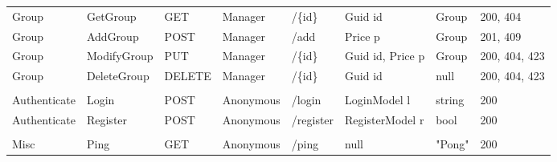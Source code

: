 \begin{table}
\begin{tabular}{llllllll}
	Group        & GetGroup      & GET     & Manager   & /\{id\}   & Guid id            & Group                             & 200, 404      \\
	Group        & AddGroup      & POST    & Manager   & /add      & Price p            & Group                             & 201, 409      \\
	Group        & ModifyGroup   & PUT     & Manager   & /\{id\}   & Guid id, Price p   & Group                             & 200, 404, 423 \\
	Group        & DeleteGroup   & DELETE  & Manager   & /\{id\}   & Guid id            & null                              & 200, 404, 423 \\
	&               &         &           &           &                    &                                   &               \\
	Authenticate & Login         & POST    & Anonymous & /login    & LoginModel l       & string                            & 200           \\
	Authenticate & Register      & POST    & Anonymous & /register & RegisterModel r    & bool                              & 200           \\
	&               &         &           &           &                    &                                   &               \\
	Misc         & Ping          & GET     & Anonymous & /ping     & null               & "Pong"                            & 200          
\end{tabular}
\end{table}

